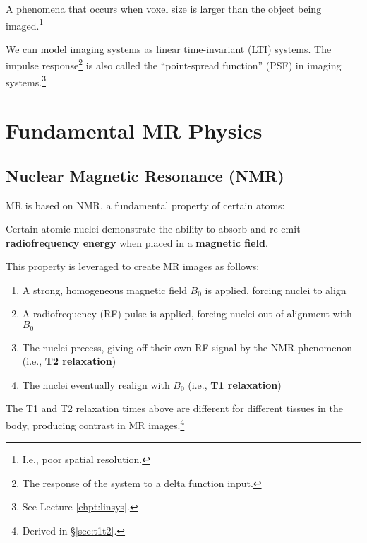\begin{defn}
A phenomena that occurs when voxel size is larger than the object being imaged.\footnote{I.e., poor spatial resolution.}
\end{defn}

\begin{defn}
We can model imaging systems as linear time-invariant (LTI) systems. The impulse response\footnote{The response of the system to a delta function input.} is also called the ``point-spread function'' (PSF) in imaging systems.\footnote{See Lecture \ref{chpt:linsys}.}
\end{defn}

\section{Fundamental MR Physics}

\subsection{Nuclear Magnetic Resonance (NMR)}

MR is based on NMR, a fundamental property of certain atoms:

\begin{defn}
Certain atomic nuclei demonstrate the ability to absorb and re-emit \textbf{radiofrequency energy} when placed in a \textbf{magnetic field}.
\end{defn}

This property is leveraged to create MR images as follows:
\begin{enumerate}
    \item A strong, homogeneous magnetic field $B_0$ is applied, forcing nuclei to align
    \item A radiofrequency (RF) pulse is applied, forcing nuclei out of alignment with $B_0$
    \item The nuclei precess, giving off their own RF signal by the NMR phenomenon (i.e., \textbf{T2 relaxation})
    \item The nuclei eventually realign with $B_0$ (i.e., \textbf{T1 relaxation})
\end{enumerate}
The T1 and T2 relaxation times above are different for different tissues in the body, producing contrast in MR images.\footnote{Derived in \S\ref{sec:t1t2}.}

